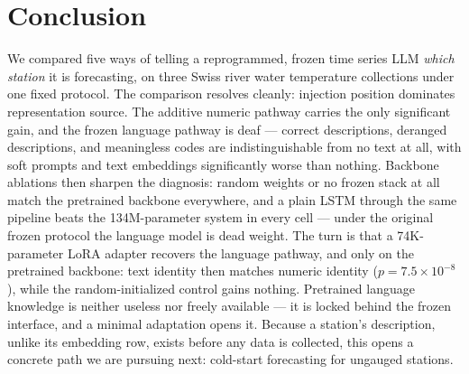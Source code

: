 \documentclass[sigconf,review]{acmart}
\newcommand{\inprogress}[1]{\textcolor{blue}{\textbf{[IN PROGRESS:} #1\textbf{]}}}
\begin{document}
\section{Conclusion}
We compared five ways of telling a reprogrammed, frozen time series LLM
\emph{which station} it is forecasting, on three Swiss river water temperature
collections under one fixed protocol. The comparison resolves cleanly: injection
position dominates representation source. The additive numeric pathway carries the
only significant gain, and the frozen language pathway is deaf --- correct
descriptions, deranged descriptions, and meaningless codes are indistinguishable
from no text at all, with soft prompts and text embeddings significantly worse
than nothing. Backbone ablations then sharpen the diagnosis: random weights or no
frozen stack at all match the pretrained backbone everywhere, and a plain LSTM
through the same pipeline beats the 134M-parameter system in every cell --- under
the original frozen protocol the language model is dead weight. The turn is that a
74K-parameter LoRA adapter recovers the language pathway, and only on the
pretrained backbone: text identity then matches numeric identity
($p{=}7.5{\times}10^{-8}$), while the random-initialized control gains nothing.
Pretrained language knowledge is neither useless nor freely available --- it is
locked behind the frozen interface, and a minimal adaptation opens it. Because a
station's description, unlike its embedding row, exists before any data is
collected, this opens a concrete path we are pursuing next: cold-start forecasting
for ungauged stations.



\end{document}
